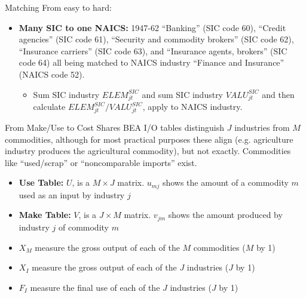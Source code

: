 \documentclass[10pt,xcolor=dvipsnames]{beamer}
\begin{document}
\begin{frame}{Matching}
From easy to hard:
\begin{itemize}
  \item \textbf{Many SIC to one NAICS:} 1947-62 ``Banking'' (SIC code 60), ``Credit agencies'' (SIC code 61), ``Security and commodity brokers'' (SIC code 62), ``Insurance carriers'' (SIC code 63), and ``Insurance agents, brokers'' (SIC code 64) all being matched to NAICS industry ``Finance and Insurance'' (NAICS code 52). 
  \begin{itemize}
    \item Sum SIC industry $ELEM_{jt}^{SIC}$ and sum SIC industry $VALU_{jt}^{SIC}$ and then calculate $ELEM_{jt}^{SIC}/VALU_{jt}^{SIC}$, apply to NAICS industry.
  \end{itemize}

\vspace{.25in} \hfill \hyperlink{Smatch}{}
\end{itemize}

\end{frame}


\begin{frame}{From Make/Use to Cost Shares}\label{Amakeuse}
BEA I/O tables distinguish $J$ industries from $M$ commodities, although for most practical purposes these align (e.g. agriculture industry produces the agricultural commodity), but not exactly. Commodities like ``used/scrap'' or ``noncomparable imports'' exist. 

\begin{itemize}
  \item \textbf{Use Table:} $U$, is a $M \times J$ matrix. $u_{mj}$ shows the amount of a commodity $m$ used as an input by industry $j$
  \item \textbf{Make Table:} $V$, is a $J \times M$ matrix. $v_{jm}$ shows the amount produced by industry $j$ of commodity $m$
  \item $X_M$ measure the gross output of each of the $M$ commodities ($M$ by 1)
  \item $X_I$ measure the gross output of each of the $J$ industries ($J$ by 1)
  \item $F_I$ measure the final use of each of the $J$ industries ($J$ by 1)
\end{itemize}

\end{frame}
\end{document}
